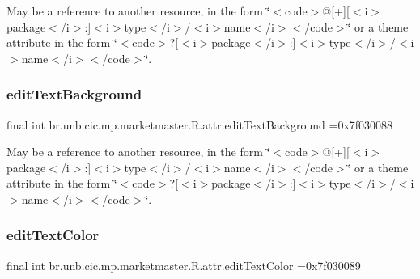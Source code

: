 May be a reference to another resource, in the form \char`\"{}$<$code$>$@\mbox{[}+\mbox{]}\mbox{[}$<$i$>$package$<$/i$>$\+:\mbox{]}$<$i$>$type$<$/i$>$/$<$i$>$name$<$/i$>$$<$/code$>$\char`\"{} or a theme attribute in the form \char`\"{}$<$code$>$?\mbox{[}$<$i$>$package$<$/i$>$\+:\mbox{]}$<$i$>$type$<$/i$>$/$<$i$>$name$<$/i$>$$<$/code$>$\char`\"{}. \mbox{\label{classbr_1_1unb_1_1cic_1_1mp_1_1marketmaster_1_1R_1_1attr_ae739c4ca09cc8e268d709827af6d0239}} 
\subsubsection{\texorpdfstring{edit\+Text\+Background}{editTextBackground}}
{\footnotesize\ttfamily final int br.\+unb.\+cic.\+mp.\+marketmaster.\+R.\+attr.\+edit\+Text\+Background =0x7f030088\hspace{0.3cm}{\ttfamily [static]}}

May be a reference to another resource, in the form \char`\"{}$<$code$>$@\mbox{[}+\mbox{]}\mbox{[}$<$i$>$package$<$/i$>$\+:\mbox{]}$<$i$>$type$<$/i$>$/$<$i$>$name$<$/i$>$$<$/code$>$\char`\"{} or a theme attribute in the form \char`\"{}$<$code$>$?\mbox{[}$<$i$>$package$<$/i$>$\+:\mbox{]}$<$i$>$type$<$/i$>$/$<$i$>$name$<$/i$>$$<$/code$>$\char`\"{}. \mbox{\label{classbr_1_1unb_1_1cic_1_1mp_1_1marketmaster_1_1R_1_1attr_afd32d9529f66636c97a9308342202e7e}} 
\subsubsection{\texorpdfstring{edit\+Text\+Color}{editTextColor}}
{\footnotesize\ttfamily final int br.\+unb.\+cic.\+mp.\+marketmaster.\+R.\+attr.\+edit\+Text\+Color =0x7f030089\hspace{0.3cm}{\ttfamily [static]}}

